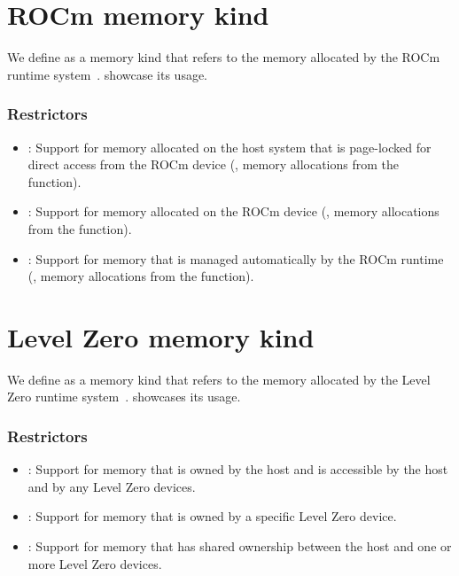 \section{ROCm memory kind}

We define  as a memory kind that refers to the memory
allocated by the ROCm runtime system~\cite{rocmref}.
showcase its usage.

\subsubsection{Restrictors}

\begin{itemize}

\item {}: Support for memory allocated on the host system that
    is page-locked for direct access from the ROCm device (\eg, memory
        allocations from the  function).

\item {}: Support for memory allocated on the ROCm device
    (\eg, memory allocations from the  function).

\item {}: Support for memory that is managed automatically
    by the ROCm runtime (\eg, memory allocations from the
         function).

\end{itemize}

\section{Level Zero memory kind}

We define  as a memory kind that refers to the memory
allocated by the Level Zero runtime system~\cite{zeref}.
 showcases its usage.

\subsubsection{Restrictors}

\begin{itemize}

\item {}: Support for memory that is owned by the host and is accessible by the host and by any Level Zero devices.

\item {}: Support for memory that is owned by a specific Level Zero device.

\item {}: Support for memory that has shared ownership between the host and one or more Level Zero devices.

\end{itemize}

